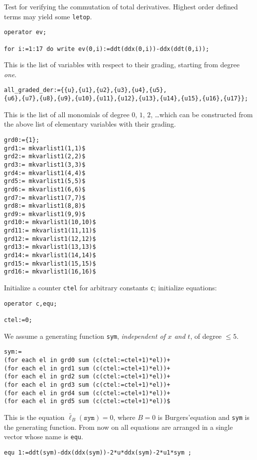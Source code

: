 \documentclass[12pt]{amsart}
\theoremstyle{definition}
\begin{document}
Test for verifying the commutation of total derivatives.
Highest order defined terms may yield some \texttt{letop}.
\begin{verbatim}
operator ev;

for i:=1:17 do write ev(0,i):=ddt(ddx(0,i))-ddx(ddt(0,i));
\end{verbatim}

This is the list of variables with respect to their grading,
starting from degree \emph{one}.
\begin{verbatim}
all_graded_der:={{u},{u1},{u2},{u3},{u4},{u5},
{u6},{u7},{u8},{u9},{u10},{u11},{u12},{u13},{u14},{u15},{u16},{u17}};
\end{verbatim}

This is the list of all monomials of degree $0$, $1$, $2$, \dots which can be
constructed from the above list of elementary variables with their grading.
\begin{verbatim}
grd0:={1};
grd1:= mkvarlist1(1,1)$
grd2:= mkvarlist1(2,2)$
grd3:= mkvarlist1(3,3)$
grd4:= mkvarlist1(4,4)$
grd5:= mkvarlist1(5,5)$
grd6:= mkvarlist1(6,6)$
grd7:= mkvarlist1(7,7)$
grd8:= mkvarlist1(8,8)$
grd9:= mkvarlist1(9,9)$
grd10:= mkvarlist1(10,10)$
grd11:= mkvarlist1(11,11)$
grd12:= mkvarlist1(12,12)$
grd13:= mkvarlist1(13,13)$
grd14:= mkvarlist1(14,14)$
grd15:= mkvarlist1(15,15)$
grd16:= mkvarlist1(16,16)$
\end{verbatim}

Initialize a counter \texttt{ctel} for arbitrary constants \texttt{c};
initialize equations:
\begin{verbatim}
operator c,equ;

ctel:=0;
\end{verbatim}

We assume a generating function \texttt{sym}, \emph{independent of $x$ and
  $t$}, of degree $\leq 5$.
\begin{verbatim}
sym:=
(for each el in grd0 sum (c(ctel:=ctel+1)*el))+
(for each el in grd1 sum (c(ctel:=ctel+1)*el))+
(for each el in grd2 sum (c(ctel:=ctel+1)*el))+
(for each el in grd3 sum (c(ctel:=ctel+1)*el))+
(for each el in grd4 sum (c(ctel:=ctel+1)*el))+
(for each el in grd5 sum (c(ctel:=ctel+1)*el))$
\end{verbatim}

This is the equation $\bar\ell_B(\mathtt{sym})=0$, where $B=0$ is
Burgers'equation and \texttt{sym} is the generating function. From now on all
equations are arranged in a single vector whose name is \texttt{equ}.
\begin{verbatim}
equ 1:=ddt(sym)-ddx(ddx(sym))-2*u*ddx(sym)-2*u1*sym ;
\end{verbatim}
\end{document}
